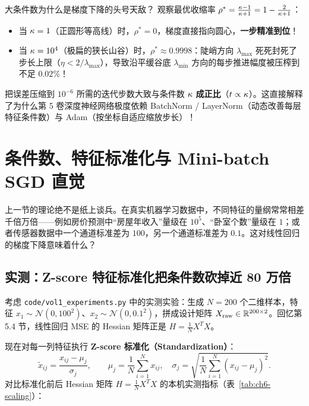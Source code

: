 \begin{insightBox}{大条件数为什么是梯度下降的头号天敌？}
观察最优收缩率 $\rho^* = \frac{\kappa - 1}{\kappa + 1} = 1 - \frac{2}{\kappa + 1}$：
\begin{itemize}
  \item 当 $\kappa = 1$（正圆形等高线）时，$\rho^* = 0$，梯度直接指向圆心，\textbf{一步精准到位}！
  \item 当 $\kappa = 10^4$（极扁的狭长山谷）时，$\rho^* \approx 0.9998$：陡峭方向 $\lambda_{\max}$ 死死封死了步长上限（$\eta < 2/\lambda_{\max}$），导致沿平缓谷底 $\lambda_{\min}$ 方向的每步推进幅度被压榨到不足 $0.02\%$！
\end{itemize}
把误差压缩到 $10^{-6}$ 所需的迭代步数大致与条件数 $\kappa$ \textbf{成正比}（$t \propto \kappa$）。这直接解释了为什么第 5 卷深度神经网络极度依赖 BatchNorm / LayerNorm（动态改善每层特征条件数）与 Adam（按坐标自适应缩放步长）！
\end{insightBox}

\section{条件数、特征标准化与 Mini-batch SGD 直觉}
\label{sec:ch6-scaling-sgd}

上一节的理论绝不是纸上谈兵。在真实机器学习数据中，不同特征的量纲常常相差千倍万倍——例如房价预测中“房屋年收入”量级在 $10^5$、“卧室个数”量级在 $1$；或者传感器数据中一个通道标准差为 $100$，另一个通道标准差为 $0.1$。这对线性回归的梯度下降意味着什么？

\subsection{实测：Z-score 特征标准化把条件数砍掉近 80 万倍}

考虑 \texttt{code/vol1\_experiments.py} 中的实测实验：生成 $N=200$ 个二维样本，特征 $x_1 \sim \mathcal{N}(0, 100^2)$、$x_2 \sim \mathcal{N}(0, 0.1^2)$，拼成设计矩阵 $X_{\text{raw}} \in \mathbb{R}^{200\times 2}$。回忆第 5.4 节，线性回归 MSE 的 Hessian 矩阵正是 $H = \frac{1}{N} X^T X$。

现在对每一列特征执行 \textbf{Z-score 标准化（Standardization）}：
\begin{equation}\label{eq:ch6-zscore}
  \tilde{x}_{ij} = \frac{x_{ij} - \mu_j}{\sigma_j},
  \qquad
  \mu_j = \frac{1}{N}\sum_{i=1}^N x_{ij},
  \quad
  \sigma_j = \sqrt{\frac{1}{N}\sum_{i=1}^N (x_{ij} - \mu_j)^2}.
\end{equation}
对比标准化前后 Hessian 矩阵 $H = \frac{1}{N}X^T X$ 的本机实测指标（表~\ref{tab:ch6-scaling}）：

